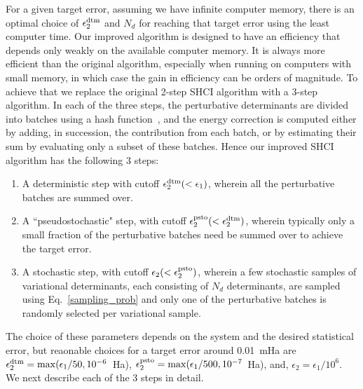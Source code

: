 \documentclass[%
reprint,
 superscriptaddress,
 amsmath,amssymb,
 aps,
]{revtex4-1}
\begin{document}
For a given target error, assuming we have infinite computer memory, there is an optimal choice of $\epsilon_2^{\rm dtm}$ and $N_d$
for reaching that target error using the least computer time.
Our improved algorithm is designed to have an efficiency that depends only weakly on the available computer memory.
It is always more efficient than the original algorithm, especially when running on computers with small memory, in which case the
gain in efficiency can be orders of magnitude.
To achieve that we replace the original 2-step SHCI algorithm with a 3-step algorithm.
In each of the three steps, the perturbative determinants are divided into batches using a hash function~\cite{Jen-Hash-97, Boost-2012},
and the energy correction is computed either by adding, in succession, the contribution from each batch,
or by estimating their sum by evaluating
only a subset of these batches.
Hence our improved SHCI algorithm has the following 3 steps:
\begin{enumerate}
\item A deterministic step with cutoff $\epsilon_2^{\rm dtm} (< \epsilon_1)$, wherein all the perturbative batches are summed over.
\item A ``pseudostochastic" step, with cutoff $\epsilon_2^{\rm psto} (< \epsilon_2^{\rm dtm})$, wherein typically only a small fraction of the perturbative batches
need be summed over to achieve the target error.
\item A stochastic step, with cutoff $\epsilon_2 (<\epsilon_2^{\rm psto}) $, wherein a few stochastic samples of variational determinants,
each consisting of $N_d$ determinants, are sampled using Eq.~\ref{sampling_prob} and only one of the
perturbative batches is randomly selected per variational sample.
\end{enumerate}
The choice of these parameters depends on the system and the desired statistical error, but
reaonable choices for a target error around 0.01~mHa are  $\epsilon_2^{\rm dtm} = \max(\epsilon_{1}/50,10^{-6}$~Ha),
$\epsilon_2^{\rm psto} = \max(\epsilon_{1}/500,10^{-7}$~Ha), and,
$\epsilon_2 = \epsilon_{1}/10^6$.
We next describe each of the 3 steps in detail.
\end{document}
